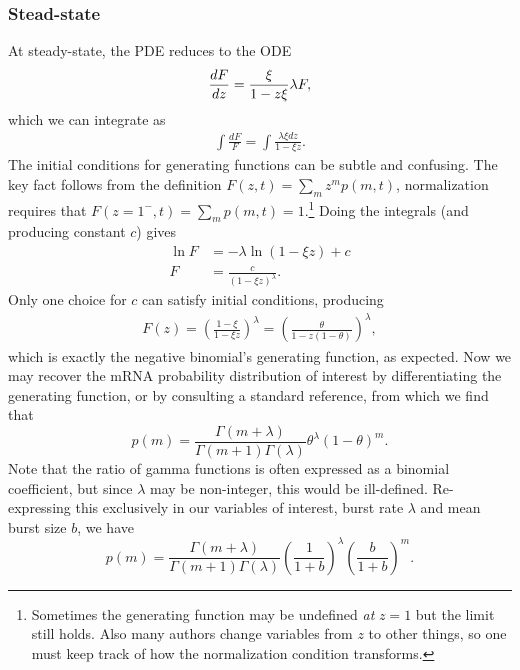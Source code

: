 \subsubsection{Stead-state}
At steady-state, the PDE reduces to the ODE
\begin{align}
\deriv[F]{z} = \frac{\xi}{1-z\xi}\lambda F,
\end{align}
which we can integrate as
\begin{align}
\int \frac{dF}{F} = \int \frac{\lambda\xi dz}{1-\xi z}.
\end{align}
The initial conditions for generating functions can be subtle and confusing.
The key fact follows from the definition
$F(z,t) = \sum_m z^m p(m,t)$,
normalization requires that
$F(z=1^-,t) = \sum_m p(m,t) = 1$.\footnote{
Sometimes the generating function may be undefined \textit{at} $z=1$ but the
limit still holds. Also many authors change variables from $z$ to other
things, so one must keep track of how the normalization condition transforms.
}
Doing the integrals (and producing constant $c$) gives
\begin{align}
\ln F &= -\lambda \ln(1-\xi z) + c
\\
F &= \frac{c}{(1-\xi z)^\lambda}.
\end{align}
Only one choice for $c$ can satisfy initial conditions, producing
\begin{align}
F(z) = \left(\frac{1-\xi}{1-\xi z}\right)^\lambda
        = \left(\frac{\theta}{1 - z(1-\theta)}\right)^\lambda,
\end{align}
which is exactly the negative binomial's generating function, as expected.
Now we may recover the mRNA probability distribution of interest
by differentiating the generating function, or by consulting a
standard reference,
from which we find that
\begin{equation}
p(m) = \frac{\Gamma(m+\lambda)}{\Gamma(m+1)\Gamma(\lambda)}
        \theta^\lambda (1-\theta)^m.
\end{equation}
Note that the ratio of gamma functions is often expressed as a
binomial coefficient, but since $\lambda$ may be non-integer,
this would be ill-defined.
Re-expressing this exclusively in our variables of interest,
burst rate $\lambda$ and mean burst size $b$, we have
\begin{equation}
p(m) = \frac{\Gamma(m+\lambda)}{\Gamma(m+1)\Gamma(\lambda)}
        \left(\frac{1}{1+b}\right)^\lambda
        \left(\frac{b}{1+b}\right)^m.
\label{eq:nbinom_deriv_final}
\end{equation}

